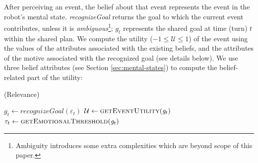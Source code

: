 After perceiving an event, the belief about that event represents the event in
the robot's mental state. \textit{recognizeGoal} returns the goal to which the
current event contributes, unless it is \textit{ambiguous}\footnote{Ambiguity
introduces some extra complexities which are beyond scope of this paper.};
$g_{t}$ represents the shared goal at time (turn) $t$ within the shared plan. We
compute the utility ($-1 \leq \mathcal{U} \leq 1$) of the event using the values
of the attributes associated with the existing beliefs, and the attributes of
the motive associated with the recognized goal (see details below). We use three
belief attributes (see Section \ref{sec:mental-states}) to compute the
belief-related part of the utility:

\begin{algorithm}
	\caption{(Relevance)}
	\label{alg:relevance}
	\begin{algorithmic}[1]
			\Statex
			\State $\mathit{g}_{t} \gets \textit{recognizeGoal}{(\varepsilon_t)}$
			\Statex
			\State $\mathcal{U} \gets \Call{getEventUtility}{\mathit{g}_{t}}$ 
			\State $\tau_{t} \gets \Call{getEmotionalThreshold}{\mathit{g}_{t}}$
			\Statex
				\State {}
			\Else
				\State {}
			\EndIf
		\EndFunction
	\end{algorithmic}
\end{algorithm}

